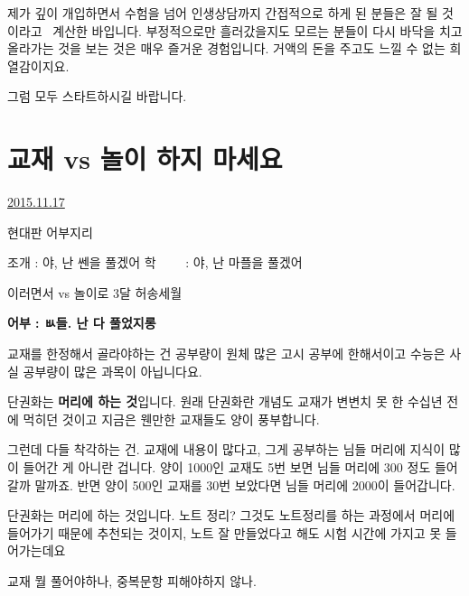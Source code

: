 제가 깊이 개입하면서 수험을 넘어 인생상담까지 간접적으로 하게 된 분들은 잘 될 것이라고  계산한 바입니다.
부정적으로만 흘러갔을지도 모르는 분들이 다시 바닥을 치고 올라가는 것을 보는 것은 매우 즐거운 경험입니다.
거액의 돈을 주고도 느낄 수 없는 희열감이지요.
\vspace{5mm}

그럼 모두 스타트하시길 바랍니다.
\vspace{5mm}






\section{교재 vs 놀이 하지 마세요}
\href{https://www.kockoc.com/Apoc/494964}{2015.11.17}

\vspace{5mm}

현대판 어부지리
\vspace{5mm}

조개 : 야, 난 쎈을 풀겠어
학     : 야, 난 마플을 풀겠어
\vspace{5mm}

이러면서 vs 놀이로 3달 허송세월
\vspace{5mm}

\textbf{어부 : ㅄ들. 난 다 풀었지롱}
\vspace{5mm}

교재를 한정해서 골라야하는 건
공부량이 원체 많은 고시 공부에 한해서이고
수능은 사실 공부량이 많은 과목이 아닙니다요.
\vspace{5mm}

단권화는 \textbf{머리에 하는 것}입니다. 원래 단권화란 개념도 교재가 변변치 못 한 수십년 전에 먹히던 것이고
지금은 웬만한 교재들도 양이 풍부합니다.
\vspace{5mm}

그런데 다들 착각하는 건. 교재에 내용이 많다고, 그게 공부하는 님들 머리에 지식이 많이 들어간 게 아니란 겁니다.
양이 1000인 교재도 5번 보면 님들 머리에 300 정도 들어갈까 말까죠.
반면 양이 500인 교재를 30번 보았다면 님들 머리에 2000이 들어갑니다.
\vspace{5mm}

단권화는 머리에 하는 것입니다.
노트 정리? 그것도 노트정리를 하는 과정에서 머리에 들어가기 때문에 추천되는 것이지,
노트 잘 만들었다고 해도 시험 시간에 가지고 못 들어가는데요
\vspace{5mm}

교재 뭘 풀어야하나, 중복문항 피해야하지 않나.
\vspace{5mm}

